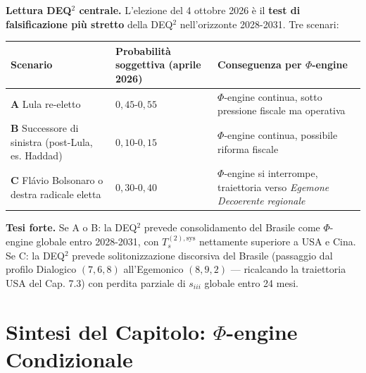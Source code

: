 \Conj{} \textbf{Lettura DEQ$^2$ centrale.} L'elezione del 4 ottobre 2026 è
il \textbf{test di falsificazione più stretto} della DEQ$^2$ nell'orizzonte
2028-2031. Tre scenari:

{\def\LTcaptype{none} %
{\small\begin{longtable}[]{@{}
  >{\raggedright\arraybackslash}p{}
  >{\raggedright\arraybackslash}p{}
  >{\raggedright\arraybackslash}p{}@{}}
\toprule\noalign{}
\begin{minipage}[b]{\linewidth}\raggedright
Scenario
\end{minipage} & \begin{minipage}[b]{\linewidth}\raggedright
Probabilità soggettiva (aprile 2026)
\end{minipage} & \begin{minipage}[b]{\linewidth}\raggedright
Conseguenza per \(\Phi\)-engine
\end{minipage} \\
\midrule\noalign{}
\endhead
\bottomrule\noalign{}
\endlastfoot
\textbf{A} Lula re-eletto & \(0{,}45\)-\(0{,}55\) & \(\Phi\)-engine
continua, sotto pressione fiscale ma operativa \\
\textbf{B} Successore di sinistra (post-Lula, es. Haddad) &
\(0{,}10\)-\(0{,}15\) & \(\Phi\)-engine continua, possibile riforma
fiscale \\
\textbf{C} Flávio Bolsonaro o destra radicale eletta &
\(0{,}30\)-\(0{,}40\) & \(\Phi\)-engine si interrompe, traiettoria verso
\emph{Egemone Decoerente regionale} \\
\end{longtable}}
}

\Hypoth{} \textbf{Tesi forte.} Se A o B: la DEQ$^2$ prevede consolidamento
del Brasile come \(\Phi\)-engine globale entro 2028-2031, con
\(T_s^{(2),\text{sys}}\) nettamente superiore a USA e Cina. Se C: la
DEQ$^2$ prevede solitonizzazione discorsiva del Brasile (passaggio dal
profilo Dialogico \((7,6,8)\) all'Egemonico \((8,9,2)\) --- ricalcando
la traiettoria USA del Cap. 7.3) con perdita parziale di \(s_{iii}\)
globale entro 24 mesi.



\section{\texorpdfstring{Sintesi del Capitolo: \(\Phi\)-engine
Condizionale}{Sintesi del Capitolo: \textbackslash Phi-engine Condizionale}}\label{sintesi-del-capitolo-phi-engine-condizionale}

